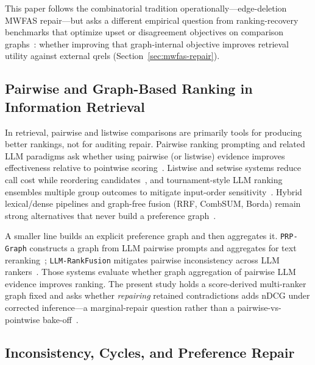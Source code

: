 \documentclass[pdflatex,sn-basic,Numbered]{sn-jnl}
\begin{document}
This paper follows the combinatorial tradition operationally---edge-deletion
MWFAS repair---but asks a different empirical question from ranking-recovery
benchmarks that optimize upset or disagreement objectives on comparison
graphs~\cite{he2022gnnrank,vahidi2024mwfas}: whether improving that
graph-internal objective improves retrieval utility against external qrels
(Section~\ref{sec:mwfas-repair}).

\subsection{Pairwise and Graph-Based Ranking in Information Retrieval}
\label{sec:related-ir}

In retrieval, pairwise and listwise comparisons are primarily tools for
producing better rankings, not for auditing repair. Pairwise ranking
prompting and related LLM paradigms ask whether using pairwise (or listwise)
evidence improves effectiveness relative to pointwise
scoring~\cite{qin-etal-2024-large,sun-etal-2023-chatgpt}. Listwise and
setwise systems reduce call cost while reordering
candidates~\cite{pradeep2023rankzephyr,zhuang2024setwise,yoon2024listt5,gangi-reddy-etal-2024-first},
and tournament-style LLM ranking ensembles multiple group outcomes to
mitigate input-order sensitivity~\cite{chen2025tourrank}. Hybrid lexical/dense
pipelines and graph-free fusion (RRF, CombSUM, Borda) remain strong
alternatives that never build a preference
graph~\cite{zhang2023hybrid,cormack2009rrf,fox1994combination,vogt1999fusion}.

A smaller line builds an explicit preference graph and then aggregates it.
\texttt{PRP-Graph} constructs a graph from LLM pairwise prompts and
aggregates for text reranking~\cite{luo2024prpgraph};
\texttt{LLM-RankFusion} mitigates pairwise inconsistency across LLM
rankers~\cite{zeng2026llmrankfusion}. Those systems evaluate whether
graph aggregation of pairwise LLM evidence improves ranking. The present
study holds a score-derived multi-ranker graph fixed and asks whether
\emph{repairing} retained contradictions adds nDCG under corrected
inference---a marginal-repair question rather than a pairwise-vs-pointwise
bake-off~\cite{thakur2021beir,craswell2021overview}.

\subsection{Inconsistency, Cycles, and Preference Repair}
\label{sec:related-repair}
\end{document}
